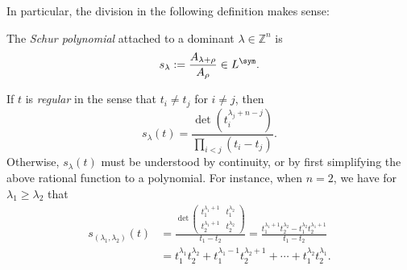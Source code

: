 \documentclass[reqno]{amsart} 
\begin{document}
In particular, the division in the following definition makes sense:
\begin{definition}
  The \emph{Schur polynomial} attached to a dominant $\lambda \in \mathbb{Z}^n$ is
  \begin{equation*}
    s_\lambda := \frac{A_{\lambda + \rho}}{A_\rho } \in L^{\sym}.
  \end{equation*}
\end{definition}
If $t$ is \emph{regular} in the sense that $t_i \neq t_j$ for $i \neq j$, then
\begin{equation}\label{eq:evaluation-Schur-rational}
  s_\lambda(t)
  =  
  \frac{\det(t_i^{\lambda_j + n - j})}{\prod_{i < j} (t_i -
    t_j)}.
\end{equation}
Otherwise, $s_\lambda(t)$ must be understood by continuity, or by first simplifying the above rational function to a polynomial.  For instance, when $n = 2$, we have for $\lambda _1 \geq \lambda_2$ that
\begin{align*}
  s_{(\lambda_1,\lambda_2)}(t)
  &=
    \frac
    {    \det    
\begin{pmatrix}
      t_1^{\lambda_1+1} &
                                                          t_1^{\lambda_2} \\      t_2^{\lambda_1+1} &
                                                                                                      t_2^{\lambda_2}    
\end{pmatrix}
    }
    {
    t_1 - t_2
    }
    =
    \frac{t_1^{\lambda_1 +1} t_2^{\lambda_2}
    - t_1^{\lambda_2} t_2^{\lambda_1 + 1}
    }{
    t_1 - t_2
    }
  \\
  &=
    t_1^{\lambda_1} t_2^{\lambda_2}
    +
    t_1^{\lambda_1 - 1} t_2^{\lambda_2 + 1}
    + \dotsb
    +
    t_1^{\lambda_2} t_2^{\lambda_1}.
\end{align*}
\end{document}
